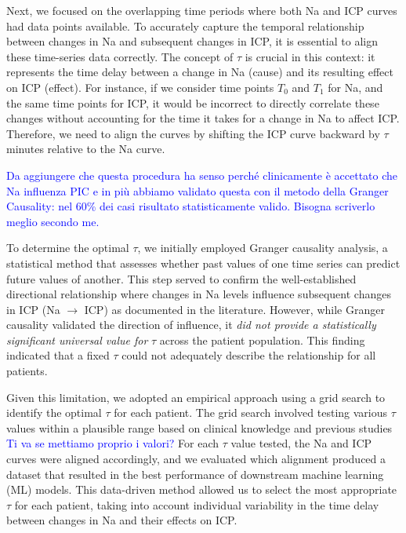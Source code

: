 Next, we focused on the overlapping time periods where both Na and ICP curves had data points available. To accurately capture the temporal relationship between changes in Na and subsequent changes in ICP, it is essential to align these time-series data correctly. The concept of $\tau$ is crucial in this context: it represents the time delay between a change in Na (cause) and its resulting effect on ICP (effect). For instance, if we consider time points $T_0$ and $T_1$ for Na, and the same time points for ICP, it would be incorrect to directly correlate these changes without accounting for the time it takes for a change in Na to affect ICP. Therefore, we need to align the curves by shifting the ICP curve backward by $\tau$ minutes relative to the Na curve.

\textcolor{blue}{Da aggiungere che questa procedura ha senso perché clinicamente è accettato che Na influenza PIC e in più abbiamo validato questa con il metodo della Granger Causality: nel 60\% dei casi risultato statisticamente valido. Bisogna scriverlo meglio secondo me.}

To determine the optimal $\tau$, we initially employed Granger causality analysis, a statistical method that assesses whether past values of one time series can predict future values of another. This step served to confirm the well-established directional relationship where changes in Na levels influence subsequent changes in ICP (Na $\rightarrow$ ICP) as documented in the literature. However, while Granger causality validated the direction of influence, it \textit{did not provide a statistically significant universal value for} $\tau$ across the patient population. This finding indicated that a fixed $\tau$ could not adequately describe the relationship for all patients.

Given this limitation, we adopted an empirical approach using a grid search to identify the optimal $\tau$ for each patient. The grid search involved testing various $\tau$ values within a plausible range based on clinical knowledge and previous studies \textcolor{blue}{Ti va se mettiamo proprio i valori?} For each $\tau$ value tested, the Na and ICP curves were aligned accordingly, and we evaluated which alignment produced a dataset that resulted in the best performance of downstream machine learning (ML) models. This data-driven method allowed us to select the most appropriate $\tau$ for each patient, taking into account individual variability in the time delay between changes in Na and their effects on ICP.

